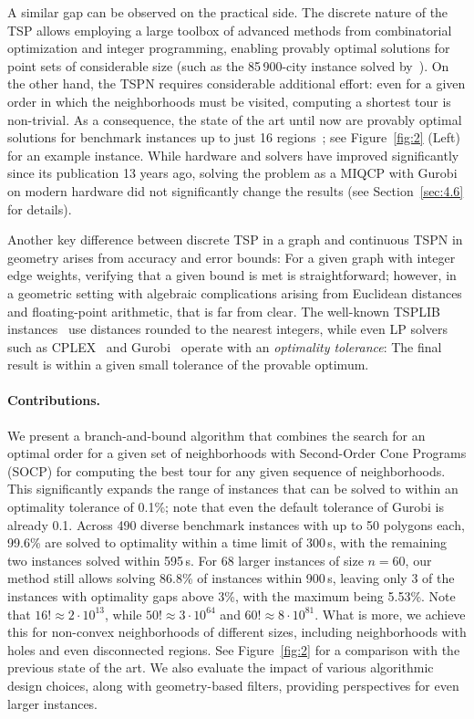 \documentclass[11pt,a4paper]{article}
\theoremstyle{plain}
\begin{document}
A similar gap can be observed on the practical side. The discrete nature of the TSP allows employing a large toolbox of advanced methods from combinatorial optimization and integer programming, enabling provably optimal solutions for point sets of considerable size (such as the 85\,900-city instance solved by~\cite{ref3,ref12}). On the other hand, the TSPN requires considerable additional effort: even for a given order in which the neighborhoods must be visited, computing a shortest tour is non-trivial. As a consequence, the state of the art until now are provably optimal solutions for benchmark instances up to just 16 regions~\cite{ref29}; see Figure~\ref{fig:2} (Left) for an example instance. While hardware and solvers have improved significantly since its publication 13 years ago, solving the problem as a MIQCP with Gurobi on modern hardware did not significantly change the results (see Section~\ref{sec:4.6} for details).

Another key difference between discrete TSP in a graph and continuous TSPN in geometry arises from accuracy and error bounds: For a given graph with integer edge weights, verifying that a given bound is met is straightforward; however, in a geometric setting with algebraic complications arising from Euclidean distances and floating-point arithmetic, that is far from clear. The well-known TSPLIB instances~\cite{ref40} use distances rounded to the nearest integers, while even LP solvers such as CPLEX~\cite{ref33} and Gurobi~\cite{ref31} operate with an \emph{optimality tolerance}: The final result is within a given small tolerance of the provable optimum.

\paragraph{Contributions.} We present a branch-and-bound algorithm that combines the search for an optimal order for a given set of neighborhoods with Second-Order Cone Programs (SOCP) for computing the best tour for any given sequence of neighborhoods. This significantly expands the range of instances that can be solved to within an optimality tolerance of 0.1\%; note that even the default tolerance of Gurobi is already 0.1\textperthousand. Across 490 diverse benchmark instances with up to 50 polygons each, 99.6\% are solved to optimality within a time limit of 300\,s, with the remaining two instances solved within 595\,s. For 68 larger instances of size $n = 60$, our method still allows solving 86.8\% of instances within 900\,s, leaving only 3 of the instances with optimality gaps above 3\%, with the maximum being 5.53\%. Note that $16! \approx 2 \cdot 10^{13}$, while $50! \approx 3 \cdot 10^{64}$ and $60! \approx 8 \cdot 10^{81}$. What is more, we achieve this for non-convex neighborhoods of different sizes, including neighborhoods with holes and even disconnected regions. See Figure~\ref{fig:2} for a comparison with the previous state of the art. We also evaluate the impact of various algorithmic design choices, along with geometry-based filters, providing perspectives for even larger instances.
\end{document}

